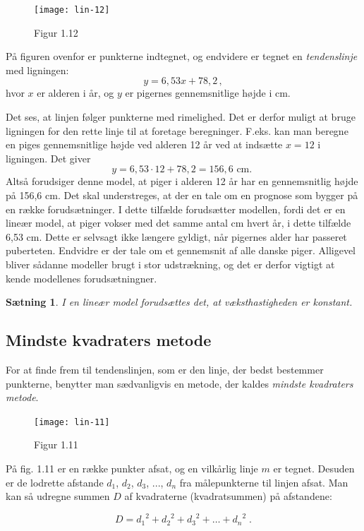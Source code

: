 \documentclass[12pt,oneside,a4paper]{article}
\newtheorem{thm}{Sætning}[section]
\begin{document}
\begin{figure}[H]
    \centering
    \texttt{[image: lin-12]}
    \caption{Figur 1.12}
    \label{fig56}
\end{figure}

På figuren ovenfor er punkterne indtegnet, og endvidere er tegnet en {\em tendenslinje} med ligningen:
\[
    y = 6,53 x + 78,2 \,,
\]
hvor $x$ er alderen i år, og $y$ er pigernes gennemsnitlige højde i cm.

Det ses, at linjen følger punkterne med rimelighed. Det er derfor muligt at bruge ligningen
for den rette linje til at foretage beregninger. F.eks. kan man beregne en piges gennemsnitlige højde ved alderen 12 år ved at indsætte $x=12$ i ligningen. Det giver
\[
    y=6,53\cdot 12 + 78,2 = 156,6 \mbox{ cm. }
\]
Altså forudsiger denne model, at piger i alderen 12 år har en gennemsnitlig
højde på 156,6 cm.  Det skal understreges, at der en tale om en prognose som
bygger på en række forudsætninger.  I dette tilfælde forudsætter modellen,
fordi det er en lineær model, at piger vokser med det samme antal cm hvert år,
i dette tilfælde 6,53 cm. Dette er selvsagt ikke længere gyldigt, når pigernes
alder har passeret puberteten. Endvidre er der tale om et gennemsnit af alle
danske piger.
Alligevel bliver sådanne modeller brugt i stor udstrækning, og det er derfor vigtigt
at kende modellenes forudsætningner. 
\begin{thm}
    I en lineær model forudsættes det, at væksthastigheden er konstant.
\end{thm}

\subsection{Mindste kvadraters metode}

For at finde frem til tendenslinjen, som er den linje, der bedst bestemmer
punkterne, benytter man sædvanligvis en metode, der kaldes {\em mindste
kvadraters metode}.

\begin{figure}[H]
    \centering
    \texttt{[image: lin-11]}
    \caption{Figur 1.11}
    \label{fig55}
\end{figure}

På fig. 1.11 er en række punkter afsat, og en vilkårlig linje $m$ er tegnet. Desuden er de
lodrette afstande $d_1$, $d_2$, $d_3$, ..., $d_n$ fra målepunkterne til linjen afsat. Man
kan så udregne summen $D$ af kvadraterne (kvadratsummen) på afstandene:

\[
D = {d_1}^2 + {d_2}^2 + {d_3}^2 + \ldots + {d_n}^2 \; . 
\]
\end{document}

